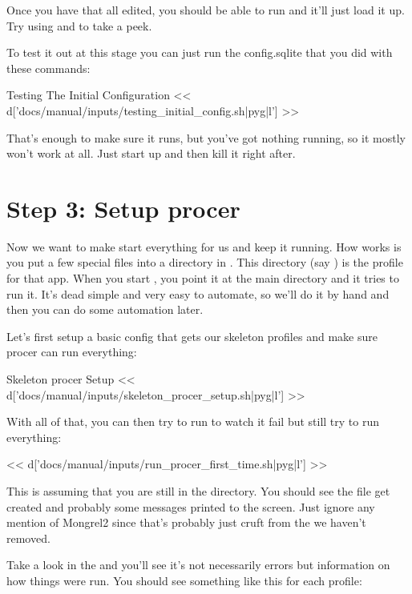 Once you have that all edited, you should be able to run  and it'll just load it up.  Try using
 and  to take a peek.


To test it out at this stage you can just run the config.sqlite that you
did with these commands:

\begin{code}{Testing The Initial Configuration}
<< d['docs/manual/inputs/testing_initial_config.sh|pyg|l'] >>
\end{code}

That's enough to make sure it runs, but you've got nothing running,
so it mostly won't work at all.  Just start up and then kill it
right after.


\section{Step 3: Setup procer}

Now we want to make  start everything for us and keep
it running.  How  works is you put a few special
files into a directory in .  This directory (say )
is the profile for that app.  When you start , you
point it at the main  directory and it tries to run it.
It's dead simple and very easy to automate, so we'll do it by hand
and then you can do some automation later.

Let's first setup a basic config that gets our skeleton profiles
and make sure procer can run everything:

\begin{code}{Skeleton procer Setup}
<< d['docs/manual/inputs/skeleton_procer_setup.sh|pyg|l'] >>
\end{code}

With all of that, you can then try to run  to watch
it fail but still try to run everything:

<< d['docs/manual/inputs/run_procer_first_time.sh|pyg|l'] >>

This is assuming that you are still in the  directory.
You should see the file  get created and
probably some messages printed to the screen.  Just ignore any
mention of Mongrel2 since that's probably just cruft from the 
we haven't removed.

Take a look in the  and you'll see it's not necessarily
errors but information on how things were run.  You should
see something like this for each profile:

